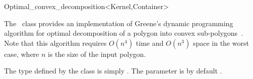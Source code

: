 
\ccRefPageBegin

\begin{ccRefClass}{Optimal_convex_decomposition<Kernel,Container>}
\label{mink_ref:opt_decomp}


\ccDefinition

The \ccRefName\ class provides an implementation of Greene's
dynamic programming algorithm for optimal decomposition of a
polygon into convex sub-polygons~\cite{g-dpcp-83}. Note that
this algorithm requires $O(n^4)$ time and $O(n^3)$ space in
the worst case, where $n$ is the size of the input polygon.

The  type defined by the class is simply
. The  parameter
is by default .


\ccIsModel

\end{ccRefClass}

\ccRefPageEnd
